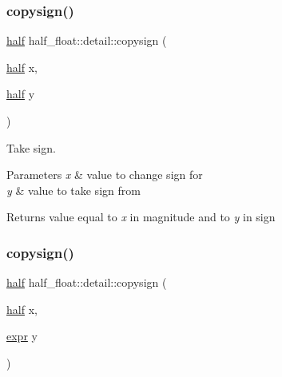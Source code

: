 \mbox{\label{namespacehalf__float_1_1detail_aca0e10e9b77c1231f05521e08d016a2d}} 
\subsubsection{\texorpdfstring{copysign()}{copysign()}\hspace{0.1cm}{\footnotesize\ttfamily [1/4]}}
{\footnotesize\ttfamily \hyperlink{classhalf__float_1_1half}{half} half\+\_\+float\+::detail\+::copysign (\begin{DoxyParamCaption}\item[{\hyperlink{classhalf__float_1_1half}{half}}]{x,  }\item[{\hyperlink{classhalf__float_1_1half}{half}}]{y }\end{DoxyParamCaption})\hspace{0.3cm}{\ttfamily [inline]}}

Take sign. 
\begin{DoxyParams}{Parameters}
{\em x} & value to change sign for \\
\hline
{\em y} & value to take sign from \\
\hline
\end{DoxyParams}
\begin{DoxyReturn}{Returns}
value equal to {\itshape x} in magnitude and to {\itshape y} in sign 
\end{DoxyReturn}
\mbox{\label{namespacehalf__float_1_1detail_a831056e8fa4d5a57221ef93835d7279f}} 
\subsubsection{\texorpdfstring{copysign()}{copysign()}\hspace{0.1cm}{\footnotesize\ttfamily [2/4]}}
{\footnotesize\ttfamily \hyperlink{classhalf__float_1_1half}{half} half\+\_\+float\+::detail\+::copysign (\begin{DoxyParamCaption}\item[{\hyperlink{classhalf__float_1_1half}{half}}]{x,  }\item[{\hyperlink{structhalf__float_1_1detail_1_1expr}{expr}}]{y }\end{DoxyParamCaption})\hspace{0.3cm}{\ttfamily [inline]}}

